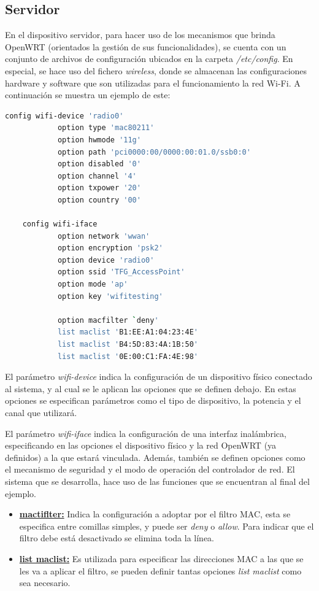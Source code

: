 \documentclass[12pt]{article}
\begin{document}
    \subsection{Servidor}
        En el dispositivo servidor, para hacer uso de los mecanismos que brinda OpenWRT (orientados la gestión de sus funcionalidades), se cuenta con un conjunto de archivos de configuración ubicados en la carpeta \textit{/etc/config}. En especial, se hace uso del fichero \textit{wireless}, donde se almacenan las configuraciones hardware y software que son utilizadas para el funcionamiento la red Wi-Fi. A continuación se muestra un ejemplo de este:

        \begin{lstlisting}[caption=/etc/config/wireless, language=bash]
    config wifi-device 'radio0'
            option type 'mac80211'
            option hwmode '11g'
            option path 'pci0000:00/0000:00:01.0/ssb0:0'
            option disabled '0'
            option channel '4'
            option txpower '20'
            option country '00'

    config wifi-iface
            option network 'wwan'
            option encryption 'psk2'
            option device 'radio0'
            option ssid 'TFG_AccessPoint'
            option mode 'ap'
            option key 'wifitesting'

            option macfilter `deny'
            list maclist 'B1:EE:A1:04:23:4E'
            list maclist 'B4:5D:83:4A:1B:50'
            list maclist '0E:00:C1:FA:4E:98'
        \end{lstlisting}

        El parámetro \textit{wifi-device} indica la configuración de un dispositivo físico conectado al sistema, y al cual se le aplican las opciones que se definen debajo. En estas opciones se especifican parámetros como el tipo de dispositivo, la potencia y el canal que utilizará.

        El parámetro \textit{wifi-iface} indica la configuración de una interfaz inalámbrica, especificando en las opciones el dispositivo físico y la red OpenWRT (ya definidos) a la que estará vinculada. Además, también se definen opciones como el mecanismo de seguridad y el modo de operación del controlador de red. El sistema que se desarrolla, hace uso de las funciones que se encuentran al final del ejemplo.
        
        \begin{itemize}
            \item \textbf{\underline{mactiflter:}} Indica la configuración a adoptar por el filtro MAC, esta se especifica entre comillas simples, y puede ser \textit{deny} o \textit{allow}. Para indicar que el filtro debe está desactivado se elimina toda la línea.
            \item \textbf{\underline{list maclist:}} Es utilizada para especificar las direcciones MAC a las que se les va a aplicar el filtro, se pueden definir tantas opciones \textit{list maclist} como sea necesario.
        \end{itemize}
\end{document}
